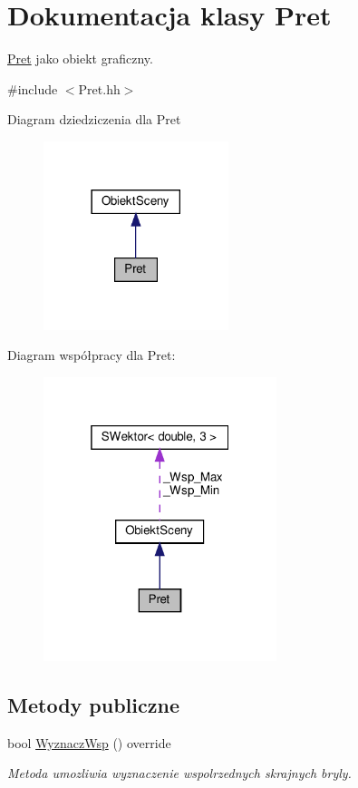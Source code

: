 \hypertarget{classPret}{}\section{Dokumentacja klasy Pret}
\label{classPret}


\hyperlink{classPret}{Pret} jako obiekt graficzny.  




{\ttfamily \#include $<$Pret.\+hh$>$}



Diagram dziedziczenia dla Pret
\nopagebreak
\begin{figure}[H]
\begin{center}
\leavevmode
\includegraphics[width=153pt]{classPret__inherit__graph}
\end{center}
\end{figure}


Diagram współpracy dla Pret\+:
\nopagebreak
\begin{figure}[H]
\begin{center}
\leavevmode
\includegraphics[width=193pt]{classPret__coll__graph}
\end{center}
\end{figure}
\subsection*{Metody publiczne}
\begin{DoxyCompactItemize}
\item 
bool \hyperlink{classPret_affe3fdc72a84022eb5bbfddbf24cc2fc}{Wyznacz\+Wsp} () override
\begin{DoxyCompactList}\small\item\em Metoda umozliwia wyznaczenie wspolrzednych skrajnych bryly. \end{DoxyCompactList}\end{DoxyCompactItemize}


